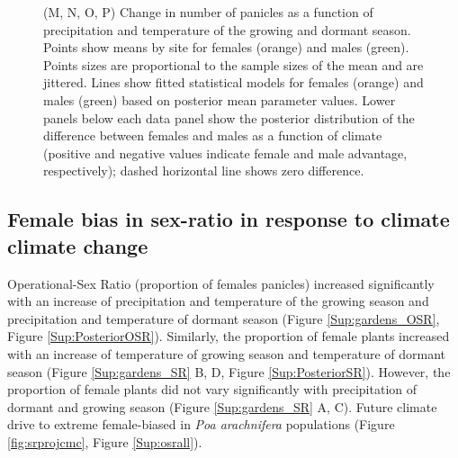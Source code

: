 \documentclass[12pt]{article}\usepackage[]{graphicx}\usepackage[dvipsnames]{xcolor}
\begin{document}
\begin{figure}[H]
\begin{center}
{  (M, N, O, P) Change in number of panicles as a function of precipitation and temperature of the growing and dormant season.
  Points show means by site for females (orange) and males (green). 
  Points sizes are proportional to the sample sizes of the mean and are jittered.
  Lines show fitted statistical models for females (orange) and males (green) based on posterior mean parameter values.
  Lower panels below each data panel show the posterior distribution of the difference between females and males as a function of climate (positive and negative values indicate female and male advantage, respectively); dashed horizontal line shows zero difference.
  }
  \label{fig:vital_rates}
  \end{center}
\end{figure}


\subsection*{Female bias in sex-ratio in response to climate climate change}
Operational-Sex Ratio (proportion of females panicles) increased significantly with an increase of precipitation and temperature of the growing season and precipitation and temperature of dormant season (Figure \ref{Sup:gardens_OSR}, Figure \ref{Sup:PosteriorOSR}). 
Similarly, the proportion of female plants increased with an increase of temperature of growing season and temperature of dormant season (Figure \ref{Sup:gardens_SR} B, D, Figure \ref{Sup:PosteriorSR}).
However, the proportion of female plants did not vary significantly with precipitation of dormant and growing season (Figure \ref{Sup:gardens_SR} A, C). 
Future climate drive to extreme female-biased in \emph{Poa arachnifera} populations (Figure \ref{fig:srprojcmc}, Figure \ref{Sup:osrall}). 
\end{document}

